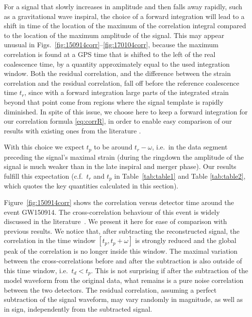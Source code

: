 \documentclass[a4paper,11pt]{article}
\begin{document}
For a signal that slowly increases in amplitude and then falls away rapidly, such as a gravitational wave inspiral, the choice of a forward integration will lead to a shift in time of the location of the maximum of the correlation integral compared to the location of the maximum amplitude of the signal. This may appear unusual in Figs.~\ref{fig:150914corr}--\ref{fig:170104corr}, because the maximum correlation is found at a GPS time that is shifted to the left of the real coalescence time, by a quantity approximately equal to the used integration window. Both the residual correlation, and the difference between the strain correlation and the residual correlation, fall off before the reference coalescence time $t_r$, since with a forward integration large parts of the integrated strain beyond that point come from regions where the signal template is rapidly diminished. In spite of this issue, we choose here to keep a forward integration for our correlation formula \ref{eq:corrR}, in order to enable easy comparison of our results with existing ones from the literature \cite{Liu:2016kib, Creswell:2017rbh, Jackson:2019xbq,Nielsen:2018bhc}.

With this choice we expect $t_p$ to be around $t_r - \omega$, i.e.~in the data segment preceding the signal's maximal strain (during the ringdown the amplitude of the signal is much weaker than in the late inspiral and merger phase). Our results fulfill this expectation (c.f.~$t_r$ and $t_p$ in Table~\ref{tab:table1} and Table \ref{tab:table2}, which quotes the key quantities calculated in this section). 






Figure~\ref{fig:150914corr} shows the correlation versus detector time around the event GW150914. The cross-correlation behaviour of this event is widely discussed in the literature~\cite{Liu:2016kib,  Creswell:2017rbh, Nielsen:2018bhc, Biwer:2018osg, Jackson:2019xbq}. We present it here for ease of comparison with previous results. We notice that, after subtracting the reconstructed signal, the correlation in the time window $[t_p, t_p+\omega]$ is strongly reduced and the global peak of the correlation is no longer inside this window. The maximal variation between the cross-correlations before and after the subtraction is also outside of this time window, i.e.~$t_d < t_p$. This is not surprising if after the subtraction of the model waveform from the original data, what remains is a pure noise correlation between the two detectors. The residual correlation, assuming a perfect subtraction of the signal waveform, may vary randomly in magnitude, as well as in sign, independently from the subtracted signal.
\end{document}
